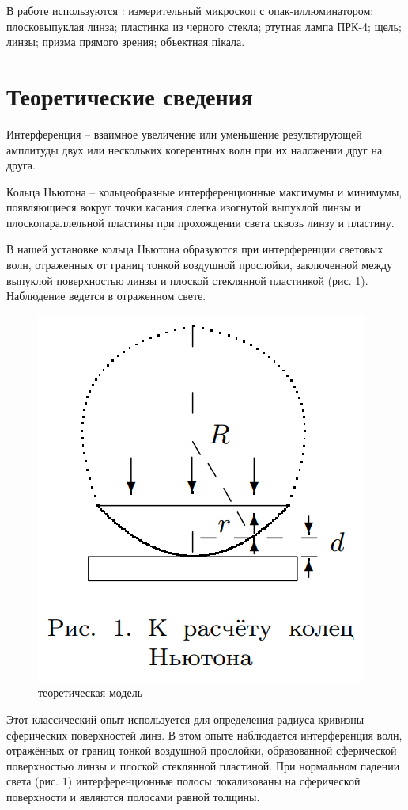 \documentclass[a4paper, 12pt]{article}%
\begin{document}
$\textbf{В работе используются}$ : измерительный микроскоп с опак-иллюминатором; плосковыпуклая линза; пластинка из черного стекла; ртутная лампа ПРК-4; щель; линзы; призма прямого зрения; объектная пікала.

\section{Теоретические сведения}

Интерференция -- взаимное увеличение или уменьшение результирующей амплитуды двух или нескольких когерентных волн при их наложении друг на друга.

Кольца Ньютона -- кольцеобразные интерференционные максимумы и минимумы, появляющиеся вокруг точки касания слегка изогнутой выпуклой линзы и плоскопараллельной пластины при прохождении света сквозь линзу и пластину.

В нашей установке кольца Ньютона образуются при интерференции световых волн, отраженных от границ тонкой воздушной прослойки, заключенной между выпуклой поверхностью линзы и плоской стеклянной пластинкой (рис. 1). Наблюдение ведется в отраженном свете.

\begin{figure}[!h]
\includegraphics[scale=0.5]{1.png}
\caption{теоретическая модель}
\label{11}
\end{figure}

Этот классический опыт используется для определения радиуса кривизны сферических поверхностей линз. В этом опыте наблюдается интерференция волн, отражённых от границ тонкой воздушной прослойки, образованной сферической поверхностью линзы и плоской стеклянной пластиной. При нормальном падении света (рис. 1) интерференционные полосы локализованы на сферической поверхности и являются полосами равной толщины.
	
\end{document}

